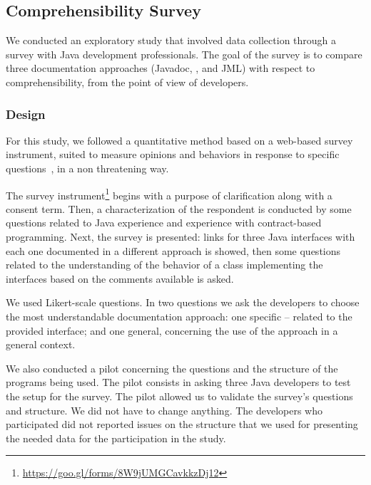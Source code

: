\subsection{Comprehensibility Survey}
\label{sec:survey}

We conducted an exploratory study that involved data collection through a survey with Java
development professionals. 
The goal of the survey is to compare three documentation approaches (Javadoc,
\contractjdoc{}, and JML) with respect to comprehensibility, from the point of view of developers. 

\subsubsection{Design}
\label{sec:surveyDes}

For this study, we followed a quantitative method based on a web-based survey instrument, suited to
measure opinions and behaviors in response to specific questions~\cite{refSurvey}, in a non
threatening way. 

The survey
instrument\footnote{\url{https://goo.gl/forms/8W9jUMGCavkkzDj12}} begins with a
purpose of clarification along with a consent term.
Then, a characterization of the
respondent is conducted by some questions related to Java experience and experience with
contract-based programming. Next, the survey is presented: links for three Java interfaces with each
one documented in a different approach is showed, then some questions related to the understanding
of the behavior of a class implementing the interfaces based on the comments available is asked. 

We used Likert-scale questions. In two questions we ask the developers to
choose the most understandable documentation approach: one specific -- related
to the provided interface; and one general, concerning the use of the approach in a general
context.

We also conducted a pilot concerning the
questions and the structure of the programs being used. The pilot consists in asking three Java
developers to test the setup for the survey.
The pilot allowed us to validate the survey's questions and structure.
We did not have to change anything. The developers who participated did not reported issues on the structure that we
used for presenting the needed data for the participation in the study.


